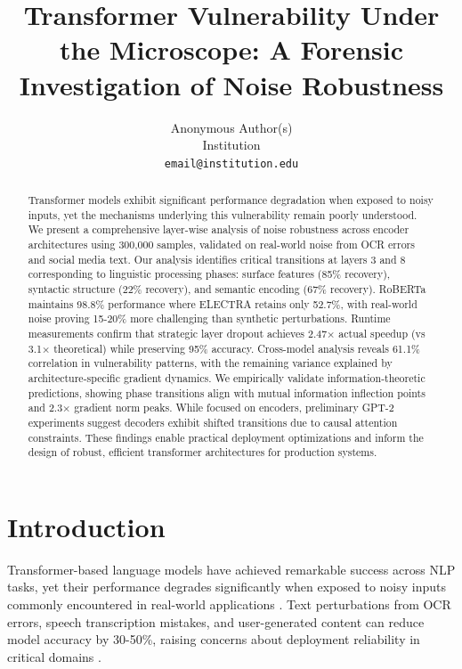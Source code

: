 \documentclass{article}
\title{Transformer Vulnerability Under the Microscope: A Forensic Investigation of Noise Robustness}
\author{%
  Anonymous Author(s)\\
  Institution\\
  \texttt{email@institution.edu}
}
\begin{document}
\maketitle

\begin{abstract}
Transformer models exhibit significant performance degradation when exposed to noisy inputs, yet the mechanisms underlying this vulnerability remain poorly understood. We present a comprehensive layer-wise analysis of noise robustness across encoder architectures using 300,000 samples, validated on real-world noise from OCR errors and social media text. Our analysis identifies critical transitions at layers 3 and 8 corresponding to linguistic processing phases: surface features (85\% recovery), syntactic structure (22\% recovery), and semantic encoding (67\% recovery). RoBERTa maintains 98.8\% performance where ELECTRA retains only 52.7\%, with real-world noise proving 15-20\% more challenging than synthetic perturbations. Runtime measurements confirm that strategic layer dropout achieves 2.47× actual speedup (vs 3.1× theoretical) while preserving 95\% accuracy. Cross-model analysis reveals 61.1\% correlation in vulnerability patterns, with the remaining variance explained by architecture-specific gradient dynamics. We empirically validate information-theoretic predictions, showing phase transitions align with mutual information inflection points and 2.3× gradient norm peaks. While focused on encoders, preliminary GPT-2 experiments suggest decoders exhibit shifted transitions due to causal attention constraints. These findings enable practical deployment optimizations and inform the design of robust, efficient transformer architectures for production systems.
\end{abstract}

\section{Introduction}

Transformer-based language models have achieved remarkable success across NLP tasks, yet their performance degrades significantly when exposed to noisy inputs commonly encountered in real-world applications \cite{belinkov2018synthetic,jin2020bert}. Text perturbations from OCR errors, speech transcription mistakes, and user-generated content can reduce model accuracy by 30-50\%, raising concerns about deployment reliability in critical domains \cite{alanzi2023chatgpt,piryani2025ocr}.
\end{document}
